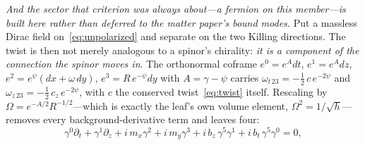\documentclass[11pt,a4paper]{article}
\theoremstyle{plain}
\theoremstyle{definition}
\theoremstyle{remark}
\begin{document}
\emph{And the sector that criterion was always about---a \emph{fermion} on this member---is built here rather than deferred to the matter paper's bound modes.} Put a massless Dirac field on~\eqref{eq:unpolarized} and separate on the two Killing directions. The twist is then not merely analogous to a spinor's chirality: \emph{it is a component of the connection the spinor moves in}. The orthonormal coframe $e^0=e^{A}dt$, $e^1=e^{A}dz$, $e^2=e^{\psi}(dx+\omega\,dy)$, $e^3=R\,e^{-\psi}dy$ with $A=\gamma-\psi$ carries $\omega_{t\,23}=-\tfrac12\,c\,e^{-2\psi}$ and $\omega_{z\,23}=-\tfrac12\,c_z\,e^{-2\psi}$, with $c$ the conserved twist~\eqref{eq:twist} itself. Rescaling by $\Omega=e^{-A/2}R^{-1/2}$---which is exactly the leaf's own volume element, $\Omega^2=1/\sqrt h$---removes every background-derivative term and leaves four:
\begin{equation}\label{eq:diracunpol}
\gamma^0\partial_t+\gamma^1\partial_z+i\,m_x\gamma^2+i\,m_y\gamma^3+i\,b_z\,\gamma^5\gamma^1+i\,b_t\,\gamma^5\gamma^0=0,
\end{equation}
\end{document}
